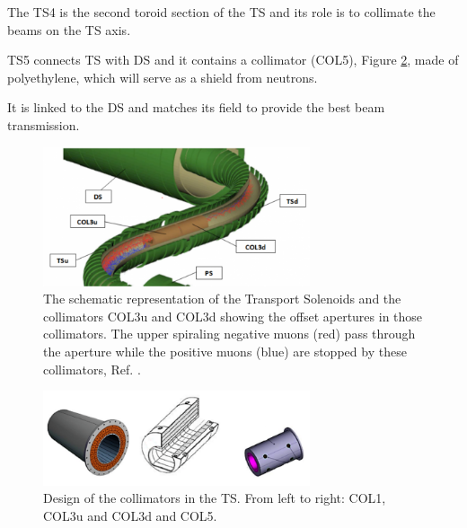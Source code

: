 The TS4 is the second toroid section of the TS and its role is 
to collimate the beams on the TS axis.

TS5 connects TS with DS and it contains a collimator (COL5), 
Figure \ref{fig:collimatorsshape}, made of polyethylene, 
{\red which will serve as a shield from neutrons.}

It is linked to the DS 
and matches its field to provide the best beam transmission.


\begin{figure}[!h]
    \centering
    \includegraphics[width =0.7\textwidth]{figures/png/800px-MuonBeamlineCollimators2.png}
    \caption[The Transport Solenoids and the collimators.]{The schematic representation of the Transport Solenoids and the collimators COL3u and 
    COL3d showing the offset apertures in those collimators. The 
    upper spiraling negative muons (red) pass through the aperture while 
    the positive muons (blue) are stopped by these collimators, Ref. \cite{tsview}.}
    \label{fig:collimators}
    \end{figure}
    \begin{figure}[!h]
        \centering
        \includegraphics[width =0.7\textwidth]{figures/png/Screenshot_20240706_120535.png}
        \caption[The design of the collimators in the TS.]{Design of the collimators in the TS. From left to right: COL1, COL3u and COL3d
        and COL5.}
        \label{fig:collimatorsshape}
        \end{figure}

